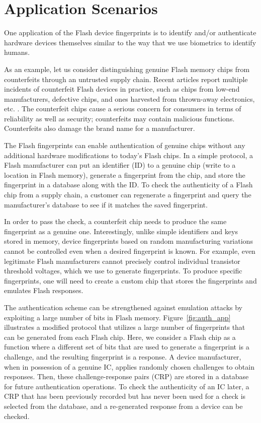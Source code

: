 \section{Application Scenarios}

One application of the Flash device fingerprints is to identify and/or authenticate hardware devices themselves similar to the way that we use biometrics to identify humans.

As an example, let us consider distinguishing genuine Flash memory chips from counterfeits through an untrusted supply chain. Recent articles report multiple incidents of counterfeit Flash devices in practice, such as chips from low-end manufacturers, defective chips, and ones harvested from thrown-away electronics, etc. \cite{trust2011, eetimesfakeparts, sosfakeflash}. The counterfeit chips cause a serious concern for consumers in terms of reliability as well as security; counterfeits may contain malicious functions. Counterfeits also damage the brand name for a manufacturer.

The Flash fingerprints can enable authentication of genuine chips without any additional hardware modifications to today’s Flash chips. In a simple protocol, a Flash manufacturer can put an identifier (ID) to a genuine chip (write to a location in Flash memory), generate a fingerprint from the chip, and store the fingerprint in a database along with the ID. To check the authenticity of a Flash chip from a supply chain, a customer can regenerate a fingerprint and query the manufacturer’s database to see if it matches the saved fingerprint. 

In order to pass the check, a counterfeit chip needs to produce the same fingerprint as a genuine one. Interestingly, unlike simple identifiers and keys stored in memory, device fingerprints based on random manufacturing variations cannot be controlled even when a desired fingerprint is known. For example, even legitimate Flash manufacturers cannot precisely control individual transistor threshold voltages, which we use to generate fingerprints. To produce specific fingerprints, one will need to create a custom chip that stores the fingerprints and emulates Flash responses.

The authentication scheme can be strengthened against emulation attacks by exploiting a large number of bits in Flash memory.  Figure~\ref{fig:auth_app} illustrates a modified protocol that utilizes a large number of fingerprints that can be generated from each Flash chip. Here, we consider a Flash chip as a function where a different set of bits that are used to generate a fingerprint is a challenge, and the resulting fingerprint is a response. A device manufacturer, when in possession of a genuine IC, applies randomly chosen challenges to obtain responses. Then, these challenge-response pairs (CRP) are stored in a database for future authentication operations. To check the authenticity of an IC later, a CRP that has been previously recorded but has never been used for a check is selected from the database, and a re-generated response from a device can be checked.


